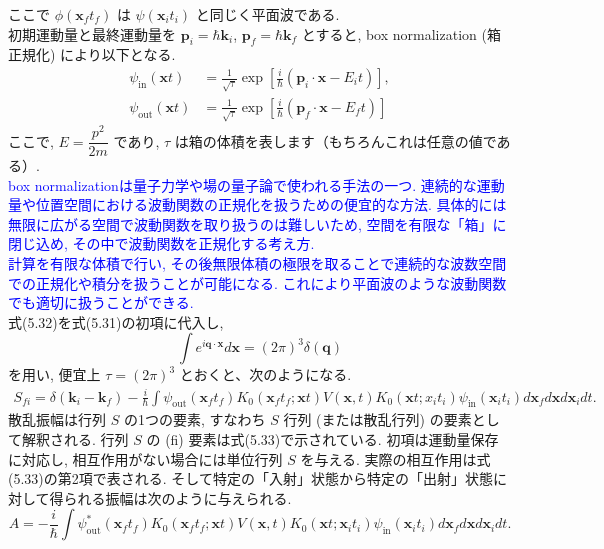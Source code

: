 \documentclass[a4paper,12pt]{article}
\begin{document}
ここで $\phi(\mathbf{x}_f t_f)$ は $\psi(\mathbf{x}_i t_i)$ と同じく平面波である.\\
初期運動量と最終運動量を $\mathbf{p}_i = \hbar \mathbf{k}_i$, $\mathbf{p}_f = \hbar \mathbf{k}_f$ とすると, box normalization (箱正規化) により以下となる.
\begin{align*}
    \psi_{\textrm{in}}(\mathbf{x}t) &= \frac{1}{\sqrt{\tau}} \exp{\left[ \frac{i}{\hbar}(\mathbf{p}_i \cdot \mathbf{x} - E_i t)\right]},\\
    \psi_{\textrm{out}}(\mathbf{x}t) &= \frac{1}{\sqrt{\tau}} \exp{\left[ \frac{i}{\hbar}(\mathbf{p}_f \cdot \mathbf{x} - E_f t)\right]} \tag{5.32}
\end{align*}
ここで, $E = \dfrac{p^2}{2m}$ であり, $\tau$ は箱の体積を表します（もちろんこれは任意の値である）.\\
\textcolor{blue}{box normalizationは量子力学や場の量子論で使われる手法の一つ. 連続的な運動量や位置空間における波動関数の正規化を扱うための便宜的な方法. 具体的には無限に広がる空間で波動関数を取り扱うのは難しいため, 空間を有限な「箱」に閉じ込め, その中で波動関数を正規化する考え方.\\
計算を有限な体積で行い, その後無限体積の極限を取ることで連続的な波数空間での正規化や積分を扱うことが可能になる. これにより平面波のような波動関数でも適切に扱うことができる.}\\
式(5.32)を式(5.31)の初項に代入し,
\begin{equation*}
    \int e^{i \mathbf{q} \cdot \mathbf{x}} d\mathbf{x} = (2\pi)^3 \delta(\mathbf{q})
\end{equation*}
を用い, 便宜上 $\tau = (2\pi)^3$ とおくと、次のようになる.
\begin{align*}
    S_{fi} = \delta(\mathbf{k}_i - \mathbf{k}_f) - \frac{i}{\hbar} \int \psi_{\textrm{out}}(\mathbf{x}_f t_f)K_0(\mathbf{x}_f t_f; \mathbf{x}t)V(\mathbf{x},t)K_0(\mathbf{x}t; x_i t_i)\psi_{\textrm{in}}(\mathbf{x}_i t_i)d\mathbf{x}_f d\mathbf{x} d\mathbf{x}_i dt. \tag{5.33}
\end{align*}
散乱振幅は行列 $S$ の1つの要素, すなわち $S$ 行列 (または散乱行列) の要素として解釈される. 行列 $S$ の (fi) 要素は式(5.33)で示されている. 初項は運動量保存に対応し, 相互作用がない場合には単位行列 $S$ を与える. 実際の相互作用は式(5.33)の第2項で表される. そして特定の「入射」状態から特定の「出射」状態に対して得られる振幅は次のように与えられる.
\begin{equation*}
    A = -\frac{i}{\hbar} \int \psi_{\textrm{out}}^{*}(\mathbf{x}_f t_f)K_0(\mathbf{x}_f t_f; \mathbf{x}t)V(\mathbf{x},t)K_0(\mathbf{x}t; \mathbf{x}_i t_i)\psi_{\textrm{in}}(\mathbf{x}_i t_i)d\mathbf{x}_f d\mathbf{x} d\mathbf{x}_i dt. \tag{5.34}
\end{equation*}
\end{document}
